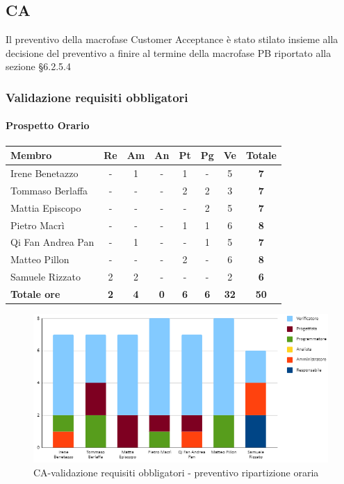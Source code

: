 \subsection{CA}
Il preventivo della macrofase Customer Acceptance è stato stilato insieme alla decisione del preventivo a finire al termine della macrofase PB riportato alla sezione §6.2.5.4
\subsubsection{Validazione requisiti obbligatori}
\paragraph{Prospetto Orario}
\begin{center}
	\renewcommand{\arraystretch}{1.8} %
	\begin{tabular}{ |m{10em}|c|c|c|c|c|c|c| }
	\hline
	\textbf{Membro} & \textbf{Re} & \textbf{Am} &  \textbf{An} &  \textbf{Pt} &  \textbf{Pg} &  \textbf{Ve} &  \textbf{Totale}\\
    \hline
    Irene Benetazzo   & - & 1 & - & 1 & - & 5 & \textbf{7} \\
    \hline
    Tommaso Berlaffa  & - & - & - & 2 & 2 & 3 & \textbf{7} \\
    \hline
    Mattia Episcopo   & - & - & - & - & 2 & 5 & \textbf{7} \\
    \hline
    Pietro Macrì      & - & - & - & 1 & 1 & 6 & \textbf{8} \\
    \hline
    Qi Fan Andrea Pan & - & 1 & - & - & 1 & 5 & \textbf{7} \\
    \hline
    Matteo Pillon     & - & - & - & 2 & - & 6 & \textbf{8} \\
    \hline
    Samuele Rizzato   & 2 & 2 & - & - & - & 2 & \textbf{6} \\
    \hline
    \textbf{Totale ore} & \textbf{2} & \textbf{4} &  \textbf{0} &  \textbf{6} &  \textbf{6} &  \textbf{32} &  \textbf{50}\\
    \hline
	\end{tabular}
\end{center}
\begin{figure}[H]
    \centering\includegraphics[width=\textwidth, height=\textheight, keepaspectratio]{images/preventivo/CA-obbligatori-orario.png}
    \caption{CA-validazione requisiti obbligatori - preventivo ripartizione oraria}
\end{figure}

